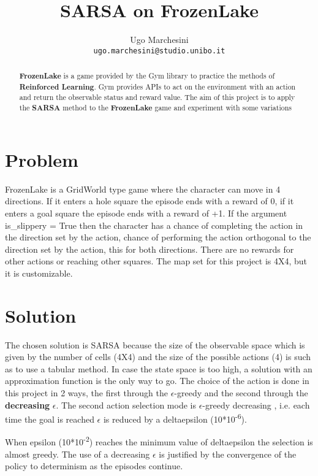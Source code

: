 \documentclass{article}
\title{SARSA on FrozenLake}
\author{%
Ugo Marchesini \\
\texttt{ugo.marchesini@studio.unibo.it}
}
\begin{document}
\maketitle

\begin{abstract}
	
\textbf{FrozenLake} is a game provided by the Gym library to practice the methods of \textbf{Reinforced Learning}.
Gym provides APIs to act on the environment with an action and return the observable status and reward value.
The aim of this project is to apply the \textbf{SARSA} method to the \textbf{FrozenLake} game and experiment with some variations
	
\end{abstract}

\section{Problem}

FrozenLake is a GridWorld type game where the character can move in 4 directions. If it enters a hole square the episode ends with a reward of 0, if it enters a goal square the episode ends with a reward of +1.
If the argument is\_slippery = True then the character has a  chance of completing the action in the direction set by the action,  chance of performing the action orthogonal to the direction set by the action, this for both directions.
There are no rewards for other actions or reaching other squares.
The map set for this project is 4X4, but it is customizable.


\section{Solution}

The chosen solution is SARSA because the size of the observable space which is given by the number of cells (4X4) and the size of the possible actions (4) is such as to use a tabular method. In case the state space is too high, a solution with an approximation function is the only way to go.
The choice of the action is done in this project in 2 ways, the first through the $\epsilon$-greedy and the second through the \textbf{decreasing} $\epsilon$.
The second action selection mode is $\epsilon$-greedy decreasing , i.e. each time the goal is reached $\epsilon$ is reduced by a deltaepsilon (10*10\textsuperscript{-6}).

When epsilon (10*10\textsuperscript{-2}) reaches the minimum value of deltaepsilon the selection is almost greedy.
The use of a decreasing $\epsilon$ is justified by the convergence of the policy to determinism as the episodes continue.
\end{document}
